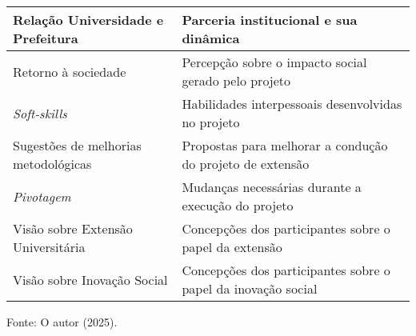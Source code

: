 \begin{longtable}{|>{\raggedright\arraybackslash}p{5cm}|>{\raggedright\arraybackslash}p{10cm}|}
Relação Universidade e Prefeitura & Parceria institucional e sua dinâmica \\ \hline
Retorno à sociedade & Percepção sobre o impacto social gerado pelo projeto \\ \hline
\textit{Soft-skills} & Habilidades interpessoais desenvolvidas no projeto \\ \hline
Sugestões de melhorias metodológicas & Propostas para melhorar a condução do projeto de extensão \\ \hline
\textit{Pivotagem} & Mudanças necessárias durante a execução do projeto \\ \hline
Visão sobre Extensão Universitária & Concepções dos participantes sobre o papel da extensão \\ \hline
Visão sobre Inovação Social & Concepções dos participantes sobre o papel da inovação social \\ \hline
\end{longtable}
{\centering Fonte: O autor (2025). \par}

